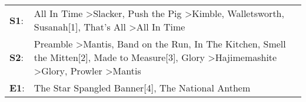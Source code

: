 \begin{supertabular}{p{0.03\textwidth}p{0.92\textwidth}}
 \textbf{S1}:  &                                                                                                                                          All In Time\textsuperscript{} \textgreater \enspace Slacker\textsuperscript{}, \enspace Push the Pig\textsuperscript{} \textgreater \enspace Kimble\textsuperscript{}, \enspace Walletsworth\textsuperscript{}, \enspace Susanah[1]\textsuperscript{}, \enspace That's All\textsuperscript{} \textgreater \enspace All In Time\textsuperscript{}  \enspace  \\
 \textbf{S2}:  &  Preamble\textsuperscript{} \textgreater \enspace Mantis\textsuperscript{}, \enspace Band on the Run\textsuperscript{}, \enspace In The Kitchen\textsuperscript{}, \enspace Smell the Mitten[2]\textsuperscript{}, \enspace Made to Measure[3]\textsuperscript{}, \enspace Glory\textsuperscript{} \textgreater \enspace Hajimemashite\textsuperscript{} \textgreater \enspace Glory\textsuperscript{}, \enspace Prowler\textsuperscript{} \textgreater \enspace Mantis\textsuperscript{}  \enspace  \\
 \textbf{E1}:  &                                                                                                                                                                                                                                                                                                                                                                                             The Star Spangled Banner[4]\textsuperscript{}, \enspace The National Anthem\textsuperscript{}  \enspace  \\
\end{supertabular}

